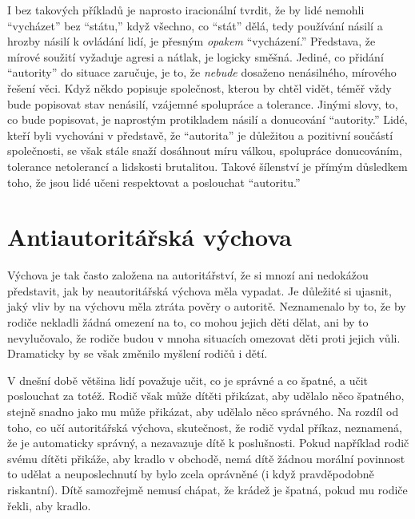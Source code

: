 \documentclass{book}
\begin{document}
I bez takových příkladů je naprosto iracionální tvrdit, že by lidé nemohli \enquote{vycházet} bez \enquote{státu,} když všechno, co \enquote{stát} dělá, tedy používání násilí a hrozby násilí k ovládání lidí, je přesným \emph{opakem} \enquote{vycházení.} Představa, že mírové soužití vyžaduje agresi a nátlak, je logicky směšná. Jediné, co přidání \enquote{autority} do situace zaručuje, je to, že \emph{nebude} dosaženo nenásilného, mírového řešení věci. Když někdo popisuje společnost, kterou by chtěl vidět, téměř vždy bude popisovat stav nenásilí, vzájemné spolupráce a tolerance. Jinými slovy, to, co bude popisovat, je naprostým protikladem násilí a donucování \enquote{autority.} Lidé, kteří byli vychováni v představě, že \enquote{autorita} je důležitou a pozitivní součástí společnosti, se však stále snaží dosáhnout míru válkou, spolupráce donucováním, tolerance netolerancí a lidskosti brutalitou. Takové šílenství je přímým důsledkem toho, že jsou lidé učeni respektovat a poslouchat \enquote{autoritu.}

\section{Antiautoritářská výchova}

Výchova je tak často založena na autoritářství, že si mnozí ani nedokážou představit, jak by neautoritářská výchova měla vypadat. Je důležité si ujasnit, jaký vliv by na výchovu měla ztráta pověry o autoritě. Neznamenalo by to, že by rodiče nekladli žádná omezení na to, co mohou jejich děti dělat, ani by to nevylučovalo, že rodiče budou v mnoha situacích omezovat děti proti jejich vůli. Dramaticky by se však změnilo myšlení rodičů i dětí.

V dnešní době většina lidí považuje učit, co je správné a co špatné, a učit poslouchat za totéž. Rodič však může dítěti přikázat, aby udělalo něco špatného, stejně snadno jako mu může přikázat, aby udělalo něco správného. Na rozdíl od toho, co učí autoritářská výchova, skutečnost, že rodič vydal příkaz, neznamená, že je automaticky správný, a nezavazuje dítě k poslušnosti. Pokud například rodič svému dítěti přikáže, aby kradlo v obchodě, nemá dítě žádnou morální povinnost to udělat a neuposlechnutí by bylo zcela oprávněné (i když pravděpodobně riskantní). Dítě samozřejmě nemusí chápat, že krádež je špatná, pokud mu rodiče řekli, aby kradlo.
\end{document}
